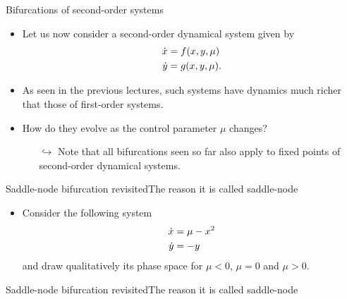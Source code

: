 \documentclass[usenames,dvipsnames,svgnames,10pt,aspectratio=169]{beamer}
\begin{document}
\begin{frame}[t, c]{Bifurcations of second-order systems}{}
	\begin{itemize}
		\item Let us now consider a second-order dynamical system given by
		\begin{equation}
			\begin{aligned}
				\dot{x} & = f(x, y, \mu) \\
				\dot{y} & = g(x, y, \mu).
			\end{aligned}
			\notag
		\end{equation}

		\item As seen in the previous lectures, such systems have dynamics much richer that those of first-order systems.

		\medskip

		\item How do they evolve as the control parameter $\mu$ changes?
		\begin{itemize}
			\item[$\hookrightarrow$] Note that all bifurcations seen so far also apply to fixed points of second-order dynamical systems.
		\end{itemize}
	\end{itemize}

	\vspace{1cm}
\end{frame}

\begin{frame}[t, c]{Saddle-node bifurcation revisited}{The reason it is called saddle-node}
	\begin{itemize}
		\item Consider the following system
		\begin{equation}
			\begin{aligned}
				\dot{x} & = \mu - x^2 \\
				\dot{y} & = - y
			\end{aligned}
			\notag
		\end{equation}
		and draw qualitatively its phase space for $\mu < 0$, $\mu = 0$ and $\mu > 0$.
	\end{itemize}

	\vspace{1cm}
\end{frame}

\begin{frame}[t, c]{Saddle-node bifurcation revisited}{The reason it is called saddle-node}

\end{frame}
\end{document}
